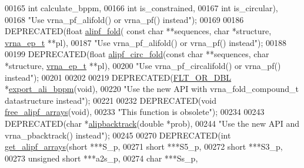 \begin{DoxyCode}
00165                       \textcolor{keywordtype}{int} calculate\_bppm,
00166                       \textcolor{keywordtype}{int} is\_constrained,
00167                       \textcolor{keywordtype}{int} is\_circular),
00168           \textcolor{stringliteral}{"Use vrna\_pf\_alifold() or vrna\_pf() instead"});
00169 
00186 DEPRECATED(\textcolor{keywordtype}{float} \hyperlink{group__part__func__global__deprecated_ga1a5f6cfb9d761fa862ce4edc7c369cd2}{alipf\_fold}( \textcolor{keyword}{const} \textcolor{keywordtype}{char} **sequences, \textcolor{keywordtype}{char} *structure, 
      \hyperlink{group__struct__utils__plist_structvrna__elem__prob__s}{vrna\_ep\_t} **pl),
00187           \textcolor{stringliteral}{"Use vrna\_pf\_alifold() or vrna\_pf() instead"});
00188 
00199 DEPRECATED(\textcolor{keywordtype}{float} \hyperlink{group__part__func__global__deprecated_ga604a42ad64178279551ad3e4def3d603}{alipf\_circ\_fold}(\textcolor{keyword}{const} \textcolor{keywordtype}{char} **sequences, \textcolor{keywordtype}{char} *structure, 
      \hyperlink{group__struct__utils__plist_structvrna__elem__prob__s}{vrna\_ep\_t} **pl),
00200           \textcolor{stringliteral}{"Use vrna\_pf\_circalifold() or vrna\_pf() instead"});
00201 
00202 
00219 DEPRECATED(\hyperlink{group__data__structures_ga31125aeace516926bf7f251f759b6126}{FLT\_OR\_DBL} *\hyperlink{group__part__func__global__deprecated_ga11b6ab8bd9be1821fea352b190a01cab}{export\_ali\_bppm}(\textcolor{keywordtype}{void}),
00220           \textcolor{stringliteral}{"Use the new API with vrna\_fold\_compound\_t datastructure instead"});
00221 
00232 DEPRECATED(\textcolor{keywordtype}{void}  \hyperlink{group__part__func__global__deprecated_ga0c0498f35686e26b38ee460d3db1a661}{free\_alipf\_arrays}(\textcolor{keywordtype}{void}),
00233           \textcolor{stringliteral}{"This function is obsolete"});
00234 
00243 DEPRECATED(\textcolor{keywordtype}{char}  *\hyperlink{group__part__func__global__deprecated_ga0df40248788f0fb17ebdc59d74116d1c}{alipbacktrack}(\textcolor{keywordtype}{double} *prob),
00244           \textcolor{stringliteral}{"Use the new API and vrna\_pbacktrack() instead"});
00245 
00270 DEPRECATED(\textcolor{keywordtype}{int} \hyperlink{group__part__func__global__deprecated_ga5349960075b1847720a2e9df021e2675}{get\_alipf\_arrays}(\textcolor{keywordtype}{short} ***S\_p,
00271                      \textcolor{keywordtype}{short} ***S5\_p,
00272                      \textcolor{keywordtype}{short} ***S3\_p,
00273                      \textcolor{keywordtype}{unsigned} \textcolor{keywordtype}{short} ***a2s\_p,
00274                      \textcolor{keywordtype}{char} ***Ss\_p,

\end{DoxyCode}
